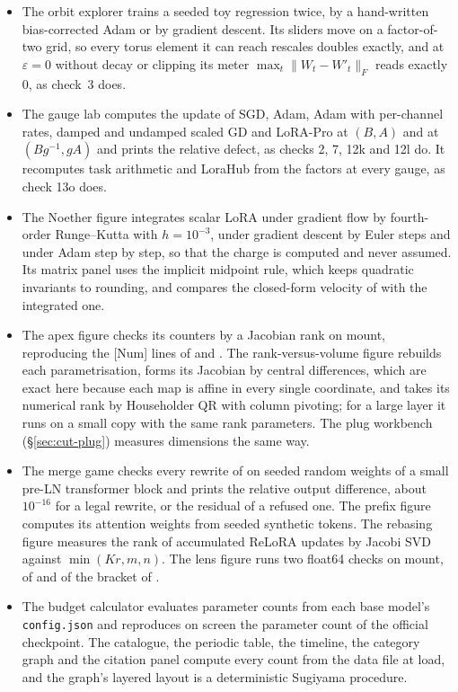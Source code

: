 \begin{itemize}
  \item The orbit explorer trains a seeded toy regression twice, by a hand-written bias-corrected Adam or by gradient
  descent. Its sliders move on a factor-of-two grid, so every torus element it can reach rescales doubles exactly, and at
  $\varepsilon=0$ without decay or clipping its meter $\max_t\lVert W_t-W'_t\rVert_F$ reads exactly $0$, as check~3
  does.
  \item The gauge lab computes the update of SGD, Adam, Adam with per-channel rates, damped and undamped scaled GD and
  LoRA-Pro at $(B,A)$ and at $(Bg^{-1},gA)$ and prints the relative defect, as checks 2, 7, 12k and 12l do. It recomputes
  task arithmetic and LoraHub from the factors at every gauge, as check 13o does.
  \item The Noether figure integrates scalar LoRA under gradient flow by fourth-order Runge--Kutta with $h=10^{-3}$, under
  gradient descent by Euler steps and under Adam step by step, so that the charge is computed and never assumed. Its
  matrix panel uses the implicit midpoint rule, which keeps quadratic invariants to rounding, and compares the
  closed-form velocity of  with the integrated one.
  \item The apex figure checks its counters by a Jacobian rank on mount, reproducing the [Num] lines of
   and . The rank-versus-volume figure rebuilds each parametrisation, forms
  its Jacobian by central differences, which are exact here because each map is affine in every single coordinate, and
  takes its numerical rank by Householder QR with column pivoting; for a large layer it runs on a small copy with the
  same rank parameters. The plug workbench (\S\ref{sec:cut-plug}) measures dimensions the same way.
  \item The merge game checks every rewrite of  on seeded random weights of a small pre-LN
  transformer block and prints the relative output difference, about $10^{-16}$ for a legal rewrite, or the residual of
  a refused one. The prefix figure computes its attention weights from seeded synthetic tokens. The rebasing figure
  measures the rank of accumulated ReLoRA updates by Jacobi SVD against $\min(Kr,m,n)$. The lens figure runs two float64
  checks on mount, of  and of the bracket of .
  \item The budget calculator evaluates parameter counts from each base model's \texttt{config.json} and reproduces on
  screen the parameter count of the official checkpoint. The catalogue, the periodic table, the timeline, the category
  graph and the citation panel compute every count from the data file at load, and the graph's layered layout is a
  deterministic Sugiyama procedure.
\end{itemize}

